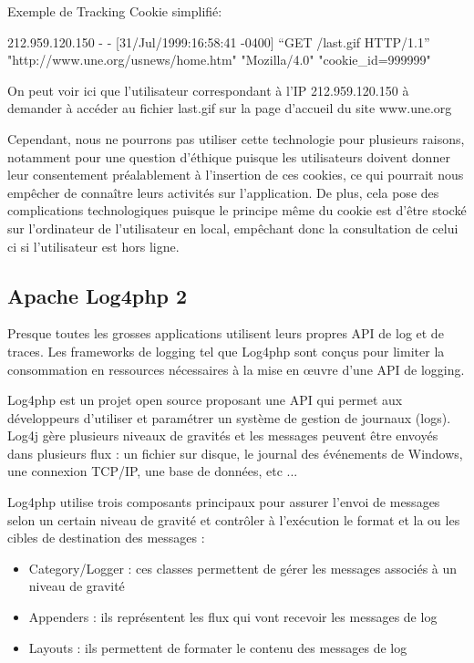             Exemple de Tracking Cookie simplifié: 
            
            212.959.120.150 - - [31/Jul/1999:16:58:41 -0400] \enquote{GET /last.gif HTTP/1.1} "http://www.une.org/usnews/home.htm" "Mozilla/4.0" "cookie_id=999999"
            
            On peut voir ici que l'utilisateur correspondant à l'IP 212.959.120.150 à demander à accéder au fichier last.gif sur la page d'accueil du site www.une.org
            
            Cependant, nous ne pourrons pas utiliser cette technologie pour plusieurs raisons, notamment pour une question d'éthique puisque les utilisateurs doivent donner leur consentement préalablement à l'insertion de ces cookies, ce qui pourrait nous empêcher de connaître leurs activités sur l'application. De plus, cela pose des complications technologiques puisque le principe même du cookie est d'être stocké sur l'ordinateur de l'utilisateur en local, empêchant donc la consultation de celui ci si l'utilisateur est hors ligne.
        
        \subsection{Apache Log4php 2}
        
        
            Presque toutes les grosses applications utilisent leurs propres API de log et de traces. Les frameworks de logging tel que Log4php sont conçus pour limiter la consommation en ressources nécessaires à la mise en œuvre d'une API de logging.
            
            Log4php est un projet open source proposant une API qui permet aux développeurs d'utiliser et paramétrer un système de gestion de journaux (logs). Log4j gère plusieurs niveaux de gravités et les messages peuvent être envoyés dans plusieurs flux : un fichier sur disque, le journal des événements de Windows, une connexion TCP/IP, une base de données, etc ...
        
            Log4php utilise trois composants principaux pour assurer l'envoi de messages selon un certain niveau de gravité et contrôler à l'exécution le format et la ou les cibles de destination des messages :

            \begin{itemize}
                \item Category/Logger : ces classes permettent de gérer les messages associés à un niveau de gravité
                \item Appenders : ils représentent les flux qui vont recevoir les messages de log
                \item Layouts : ils permettent de formater le contenu des messages de log

            \end{itemize}

